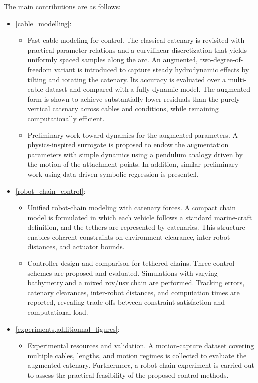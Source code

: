 The main contributions are as follows:
\begin{itemize}
	\item \cref{cable_modelling}:
	      \begin{itemize}
		      \item Fast cable modeling for control. The classical catenary is revisited with practical parameter
		            relations and a curvilinear discretization that yields uniformly spaced samples along the arc. An
		            augmented, two-degree-of-freedom variant is introduced to capture steady hydrodynamic effects by
		            tilting and rotating the catenary. Its accuracy is evaluated over a multi-cable dataset and
		            compared with a fully dynamic model. The augmented form is shown to achieve substantially lower
		            residuals than the purely vertical catenary across cables and conditions, while remaining
		            computationally efficient.
		      \item Preliminary work toward dynamics for the augmented parameters. A physics-inspired surrogate is
		            proposed to endow the augmentation parameters with simple dynamics using a pendulum analogy driven
		            by the motion of the attachment points. In addition, similar preliminary work using data-driven
		            symbolic regression is presented.
	      \end{itemize}

	\item \cref{robot_chain_control}:
	      \begin{itemize}
		      \item Unified robot-chain modeling with catenary forces. A compact chain model is formulated in which
		            each vehicle follows a standard marine-craft definition, and the tethers are represented by
		            catenaries. This structure enables coherent constraints on environment clearance, inter-robot
		            distances, and actuator bounds.
		      \item Controller design and comparison for tethered chains. Three control schemes are proposed and
		            evaluated. Simulations with varying bathymetry and a mixed \ac{rov}/\ac{usv} chain are performed.
		            Tracking errors, catenary clearances, inter-robot distances, and computation times are reported,
		            revealing trade-offs between constraint satisfaction and computational load.
	      \end{itemize}

	\item \cref{experiments,additionnal_figures}:
	      \begin{itemize}
		      \item Experimental resources and validation. A motion-capture dataset covering multiple cables, lengths,
		            and motion regimes is collected to evaluate the augmented catenary. Furthermore, a robot chain
		            experiment is carried out to assess the practical feasibility of the proposed control methods.
	      \end{itemize}
\end{itemize}

